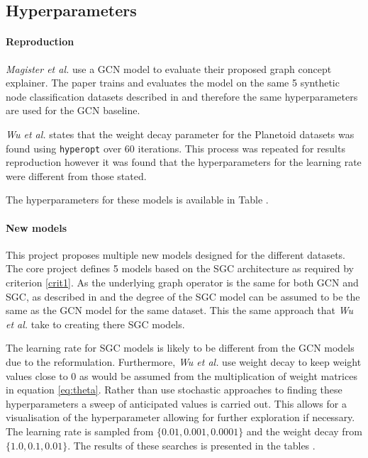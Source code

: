 \subsection{Hyperparameters}

\paragraph{Reproduction}
\textit{Magister et al.}\cite{magister2021gcexplainer} use a GCN model to evaluate their proposed graph concept explainer.
The paper trains and evaluates the model on the same 5 synthetic node classification datasets described in  and therefore the same hyperparameters are used for the GCN baseline.

\textit{Wu et al.}\cite{wu2019simplifying} states that the weight decay parameter for the Planetoid datasets was found using \texttt{hyperopt} over 60 iterations.
This process was repeated for results reproduction however it was found that the hyperparameters for the learning rate were different from those stated.

The hyperparameters for these models is available in Table .

\paragraph{New models}
This project proposes multiple new models designed for the different datasets.
The core project defines 5 models based on the SGC architecture as required by criterion \ref{crit1}.
As the underlying graph operator is the same for both GCN and SGC, as described in  and  the degree of the SGC model can be assumed to be the same as the GCN model for the same dataset.
This the same approach that \textit{Wu et al.}\cite{wu2019simplifying} take to creating there SGC models.

The learning rate for SGC models is likely to be different from the GCN models due to the reformulation.
Furthermore, \textit{Wu et al.}\cite{wu2019simplifying} use weight decay to keep weight values close to $0$ as would be assumed from the multiplication of weight matrices in equation \ref{eq:theta}.
Rather than use stochastic approaches to finding these hyperparameters a sweep of anticipated values is carried out.
This allows for a visualisation of the hyperparameter allowing for further exploration if necessary.
The learning rate is sampled from $\{0.01, 0.001, 0.0001\}$ and the weight decay from $\{1.0, 0.1, 0.01\}$.
The results of these searches is presented in the tables .

